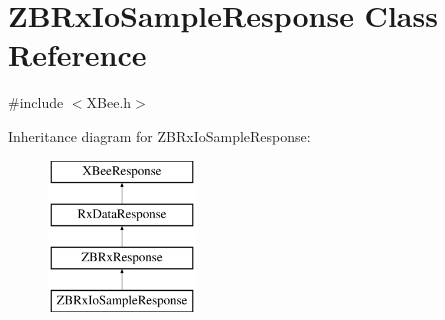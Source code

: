 \hypertarget{classZBRxIoSampleResponse}{\section{\-Z\-B\-Rx\-Io\-Sample\-Response \-Class \-Reference}
\label{classZBRxIoSampleResponse}
}


{\ttfamily \#include $<$\-X\-Bee.\-h$>$}

\-Inheritance diagram for \-Z\-B\-Rx\-Io\-Sample\-Response\-:\begin{figure}[H]
\begin{center}
\leavevmode
\includegraphics[height=4.000000cm]{classZBRxIoSampleResponse}
\end{center}
\end{figure}
